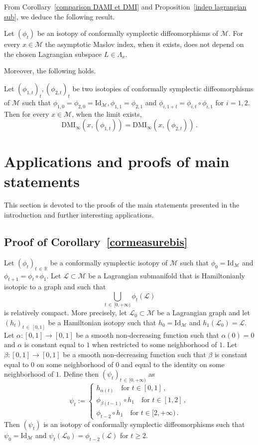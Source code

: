 \documentclass[AHL, Unicode, longabstracts, published]{cedram}
\newcommand*\M{\mathcal{M}}
\newcommand*\cl{\mathcal{L}}
\newcommand{\rId}{\mathrm{Id}}
\newcommand{\DMI}{\mathrm{DMI}}
\newcommand*\R{\mathbb{R}}
\begin{document}
From Corollary~\ref{comparison DAMI et DMI} and Proposition~\ref{indep lagrangian sub}, we deduce the following result.
\begin{coro}\label{no subspace}
Let $(\phi_t) $ be an isotopy of conformally symplectic diffeomorphisms of $\M$. For every $x\in \M$ the asymptotic Maslov index, when it exists, does not depend on the chosen Lagrangian subspace $L\in\Lambda_x$.
\end{coro}


Moreover, the following holds.
\begin{coro}
Let $(\phi_{1,t})_t, (\phi_{2,t})_t$ be two isotopies of conformally symplectic diffeomorphisms of $\M$ such that $\phi_{1,0}=\phi_{2,0}=\rId_{\M}, \phi_{1,1}=\phi_{2,1}$ and $\phi_{i,1+t}=\phi_{i,t}\circ\phi_{i,1}$ for $i=1,2$. Then for every $x\in\M$, when the limit exists,
\[
\DMI_\infty(x,(\phi_{1,t}))=\DMI_\infty(x,(\phi_{2,t}))\,.
\]
\end{coro}


\section{Applications and proofs of main statements}\label{section applications}

This section is devoted to the proofs of the main statements presented in the introduction and further interesting applications.

\subsection{Proof of Corollary~\ref{cormeasurebis}}

Let $(\phi_t)_{t\,\in\,\R}$ be a conformally symplectic isotopy of $\M$ such that $\phi_0=\rId_\M$ and $\phi_{t+1}=\phi_t\circ\phi_1$. Let $\cl\subset \M $ be a Lagrangian submanifold that is Hamiltonianly isotopic to a graph and such that
\[
\displaystyle{\bigcup_{t\,\in\,[0, +\infty)}\phi_t(\cl)}
\]
is relatively compact.\newline
More precisely, let $\cl_0\subset\M$ be a Lagrangian graph and let $(h_t)_{t\,\in\,[0,1]}$ be a Hamiltonian isotopy such that $h_0=\rId_{\M}$ and $h_1(\cl_0)=\cl$. Let $\alpha:[0,1]\to[0,1]$ be a smooth non-decreasing function such that $\alpha(0)=0$ and $\alpha$ is constant equal to $1$ when restricted to some neighborhood of $1$. Let $\beta:[0,1]\to[0,1]$ be a smooth non-decreasing function such that $\beta$ is constant equal to $0$ on some neighborhood of $0$ and equal to the identity on some neighborhood of $1$. Define then $(\psi_t)_{t\,\in\,[0,+\infty)}$ as
\[
{\psi_t:=
\begin{cases}
h_{\alpha(t)}\quad \text{for }t\in\left[0,1\right]\,, \\
\phi_{\beta(t-1)}\circ h_1\quad\text{for }t\in[1,2]\,, \\
\phi_{t-2}\circ h_1\quad \text{for }t\in[2,+\infty)\,.
\end{cases}}
\]
Then $(\psi_t) $ is an isotopy of conformally symplectic diffeomorphisms such that $\psi_0=\rId_\M$ { and $\psi_t(\cl_0)=\phi_{t-2}(\cl)$ for $t\geq 2$}.
\end{document}
